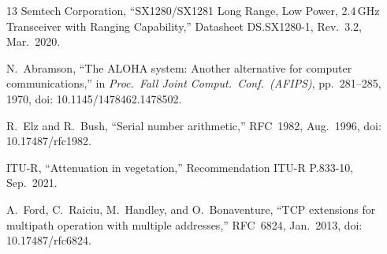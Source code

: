 \documentclass[conference]{IEEEtran}
\begin{document}
\begin{thebibliography}{13}
Semtech Corporation,
``SX1280/SX1281 Long Range, Low Power, 2.4\,GHz Transceiver with Ranging Capability,''
Datasheet DS.SX1280-1, Rev.\ 3.2, Mar.\ 2020.

N.~Abramson,
``The ALOHA system: Another alternative for computer communications,''
in \textit{Proc.\ Fall Joint Comput.\ Conf.\ (AFIPS)}, pp.~281--285, 1970,
doi: 10.1145/1478462.1478502.

R.~Elz and R.~Bush,
``Serial number arithmetic,''
RFC~1982, Aug.\ 1996,
doi: 10.17487/rfc1982.

ITU-R,
``Attenuation in vegetation,''
Recommendation ITU-R P.833-10, Sep.\ 2021.

A.~Ford, C.~Raiciu, M.~Handley, and O.~Bonaventure,
``TCP extensions for multipath operation with multiple addresses,''
RFC~6824, Jan.\ 2013,
doi: 10.17487/rfc6824.

\end{thebibliography}
\end{document}
